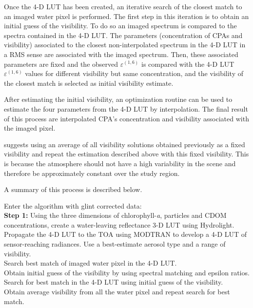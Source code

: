 Once the 4-D LUT has been created, an iterative search of the closest match to an imaged water pixel is performed. The first step in this iteration is to obtain an initial guess of the visibility. To do so an imaged spectrum is compared to the spectra contained in the 4-D LUT. The parameters (concentration of CPAs and visibility) associated to the closest non-interpolated spectrum in the 4-D LUT in a RMS sense are associated with the imaged spectrum. Then, these associated parameters are fixed and the observed $\varepsilon^{(1,6)}$ is compared with the 4-D LUT $\varepsilon^{(1,6)}$ values for different visibility but same concentration, and the visibility of the closest match is selected as initial visibility estimate.

After estimating the initial visibility, an optimization routine can be used to estimate the four parameters from the 4-D LUT by interpolation. The final result of this process are interpolated CPA's concentration and visibility associated with the imaged pixel.

\cite{GeraceThesis} suggests using an average of all visibility solutions obtained previously as a fixed visibility and repeat the estimation described above with this fixed visibility. This is because the atmosphere should not have a high variability in the scene and therefore be approximately constant over the study region.

A summary of this process is described below.

Enter the algorithm with glint corrected data:\\
{\bf Step 1:} Using the three dimensions of chlorophyll-{\it a}, particles and CDOM concentrations, create a water-leaving reflectance 3-D LUT using Hydrolight.\\
 Propagate the 4-D LUT to the TOA using MODTRAN to develop a 4-D LUT of sensor-reaching radiances. Use a best-estimate aerosol type and a range of visibility.\\
 Search best match of imaged water pixel in the 4-D LUT.\\
 Obtain initial guess of the visibility by using spectral matching and epsilon ratios.\\
 Search for best match in the 4-D LUT using initial guess of the visibility.\\
 Obtain average visibility from all the water pixel and repeat search for best match.\\

